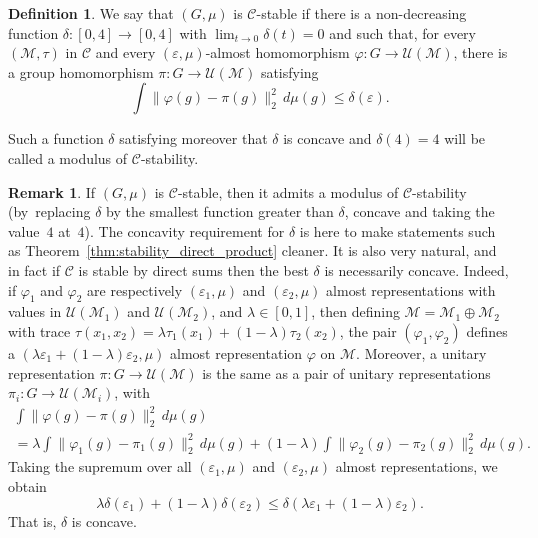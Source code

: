 \documentclass[JEP,XML,SOM,Unicode,published]{cedram}
\theoremstyle{plain}
\theoremstyle{definition}
\newtheorem{definition}[theorem]{Definition}
\newtheorem{remark}[theorem]{Remark}
\newcommand{\cM}{\mathcal{M}}
\newcommand{\vn}{\mathcal{C}}
\newcommand{\cU}{\mathcal{U}}
\begin{document}
\begin{definition}\label{def:stability}
We say that $(G,\mu)$ is $\vn$-stable if there is a non-decreasing
function $\delta:[0,4]\to [0,4]$ with $\lim_{t \to 0} \delta(t)= 0$ and such that, for every $(\cM,\tau)$ in $\vn$ and every $(\varepsilon,\mu)$-almost homomorphism $\varphi: G \to \cU(\cM)$, there is a group homomorphism $\pi:G \to
\cU(\cM)$ satisfying
\[
\int \|\varphi(g) - \pi(g)\|_2^2 \,d\mu(g) \leq \delta(\varepsilon).
\]

Such a function $\delta$ satisfying moreover that $\delta$ is concave and $\delta(4)= 4$ will be called a modulus of $\vn$-stability.
\end{definition}
\begin{remark} If $(G,\mu)$ is $\vn$-stable, then it admits a modulus of $\vn$-stability (by~replacing $\delta$ by the smallest function greater than $\delta$, concave and taking the value~$4$ at~$4$). The concavity requirement for $\delta$ is here to make statements such as Theorem~\ref{thm:stability_direct_product} cleaner. It is also very natural, and in fact if $\vn$ is stable by direct sums then the best $\delta$ is necessarily concave. Indeed, if $\varphi_1$ and $\varphi_2$ are respectively $(\varepsilon_1,\mu)$ and $(\varepsilon_2,\mu)$ almost representations with values in $\cU(\cM_1)$ and $\cU(\cM_2)$, and $\lambda \in [0,1]$, then defining $\cM = \cM_1\oplus \cM_2$ with trace $\tau(x_1,x_2) = \lambda \tau_1(x_1) + (1-\lambda)\tau_2(x_2)$, the pair $(\varphi_1,\varphi_2)$ defines a $(\lambda\varepsilon_1+(1-\lambda)\varepsilon_2,\mu)$ almost representation $\varphi$ on $\cM$. Moreover, a unitary representation $\pi:G\to \cU(\cM)$ is the same as a pair of unitary representations $\pi_i:G\to \cU(\cM_i)$, with
\begin{multline*} \int \|\varphi(g) - \pi(g)\|_2^2 \,d\mu(g) \\=\lambda \int \|\varphi_1(g) - \pi_1(g)\|_2^2 \,d\mu(g) + (1-\lambda) \int \|\varphi_2(g) - \pi_2(g)\|_2^2 \,d\mu(g).
\end{multline*}
Taking the supremum over all $(\varepsilon_1,\mu)$ and $(\varepsilon_2,\mu)$ almost representations, we obtain
\[
\lambda\delta(\varepsilon_1) + (1-\lambda)\delta(\varepsilon_2) \leq \delta(\lambda\varepsilon_1+(1-\lambda)\varepsilon_2).
\]
That is, $\delta$ is concave.
\end{remark}
\end{document}
